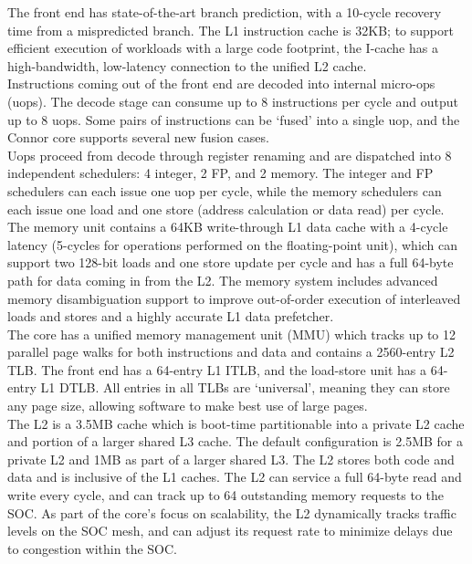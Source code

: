 \documentclass{article}
\begin{document}
The front end has state-of-the-art branch prediction, with a 10-cycle
recovery time from a mispredicted branch. The L1 instruction cache is
32KB; to support efficient execution of workloads with a large code
footprint, the I-cache has a high-bandwidth, low-latency connection to
the unified L2 cache. \\

Instructions coming out of the front end are decoded into internal
micro-ops (uops). The decode stage can consume up to 8 instructions
per cycle and output up to 8 uops. Some pairs of instructions can be
‘fused’ into a single uop, and the Connor core supports several new
fusion cases. \\

Uops proceed from decode through register renaming and are dispatched
into 8 independent schedulers: 4 integer, 2 FP, and 2 memory. The
integer and FP schedulers can each issue one uop per cycle, while the
memory schedulers can each issue one load and one store (address
calculation or data read) per cycle. \\

The memory unit contains a 64KB write-through L1 data cache with a
4-cycle latency (5-cycles for operations performed on the
floating-point unit), which can support two 128-bit loads and one
store update per cycle and has a full 64-byte path for data coming in
from the L2. The memory system includes advanced memory disambiguation
support to improve out-of-order execution of interleaved loads and
stores and a highly accurate L1 data prefetcher. \\

The core has a unified memory management unit (MMU) which tracks up to
12 parallel page walks for both instructions and data and contains a
2560-entry L2 TLB. The front end has a 64-entry L1 ITLB, and the
load-store unit has a 64-entry L1 DTLB. All entries in all TLBs
are ‘universal’, meaning they can store any page size, allowing
software to make best use of large pages. \\

The L2 is a 3.5MB cache which is boot-time partitionable into a
private L2 cache and portion of a larger shared L3 cache. The default
configuration is 2.5MB for a private L2 and 1MB as part of a larger
shared L3.  The L2 stores both code and data and is inclusive of the
L1 caches. The L2 can service a full 64-byte read and write every
cycle, and can track up to 64 outstanding memory requests to the
SOC. As part of the core’s focus on scalability, the L2 dynamically
tracks traffic levels on the SOC mesh, and can adjust its request rate
to minimize delays due to congestion within the SOC. \\
\end{document}
